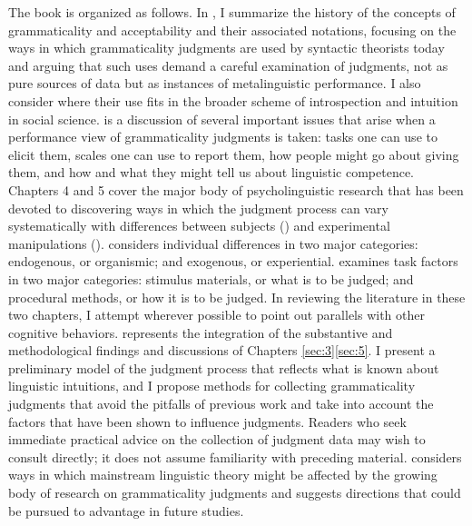 The book is organized as follows. In , I summarize the history of the concepts of grammaticality and acceptability and their associated notations, focusing on the ways in which grammaticality judgments are used by syntactic theorists today and arguing that such uses demand a careful examination of judgments, not as pure sources of data but as instances of metalinguistic performance. I also consider where their use fits in the broader scheme of introspection and intuition in social science.  is a discussion of several important issues that arise when a performance view of grammaticality judgments is taken: tasks one can use to elicit them, scales one can use to report them, how people might go about giving them, and how and what they might tell us about linguistic competence. Chapters 4 and 5 cover the major body of psycholinguistic research that has been devoted to discovering ways in which the judgment process can vary systematically with differences between subjects () and experimental manipulations ().  considers individual differences in two major categories: endogenous, or organismic; and exogenous, or experiential.  examines task factors in two major categories: stimulus materials, or what is to be judged; and procedural methods, or how it is to be judged. In reviewing the literature in these two chapters, I attempt wherever possible to point out parallels with other cognitive behaviors.  represents the integration of the substantive and methodological findings and discussions of Chapters \ref{sec:3}\textendash{}\ref{sec:5}. I present a preliminary model of the judgment process that reflects what is known about linguistic intuitions, and I propose methods for collecting grammaticality judgments that avoid the pitfalls of previous work and take into account the factors that have
been shown to influence judgments. Readers who seek immediate practical advice on the collection of judgment data may wish to consult  directly; it does not assume familiarity with preceding material.  considers ways in which mainstream linguistic theory might be affected by the growing body of research on grammaticality judgments and suggests directions that could be pursued to advantage in future studies.